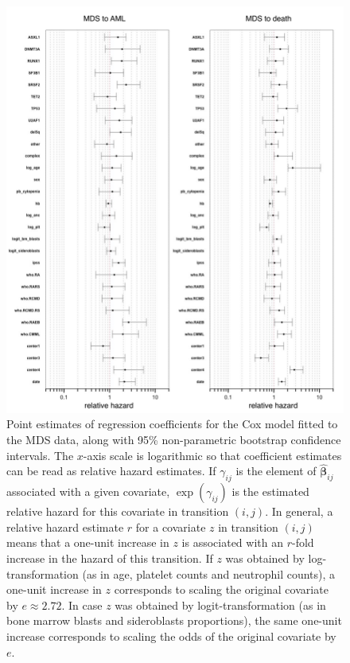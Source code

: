     \begin{figure}[h] 
    \centering         
    \includegraphics[width=12.5cm, angle=0]{figures/coef_plots.pdf} %
    \vspace*{-0.25cm}     %
    \caption{Point estimates of regression coefficients for the Cox model fitted to the MDS data, along with 95\% non-parametric bootstrap confidence intervals. The $x$-axis scale is logarithmic so that coefficient estimates can be read as relative hazard estimates.  If $\gamma_{ij}$ is the element of $\hat{\boldsymbol{\beta}}_{ij}$ associated with a given covariate, $\exp\left(\gamma_{ij}\right)$ is the estimated relative hazard for this covariate in transition $\left(i,j\right)$. In general, a relative hazard estimate $r$ for a covariate $z$ in transition $\left(i,j\right)$ means that a one-unit increase in $z$ is associated with an $r$-fold increase in the hazard of this transition. If $z$ was obtained by log-transformation (as in age, platelet counts and neutrophil counts), a one-unit increase in $z$ corresponds to scaling the original covariate by $e\approx 2.72$. In case $z$ was obtained by logit-transformation (as in bone marrow blasts and sideroblasts proportions), the same one-unit increase corresponds to scaling the odds of the original covariate by $e$.}      
    \label{fig:coef_plots} %
    \end{figure}
    
